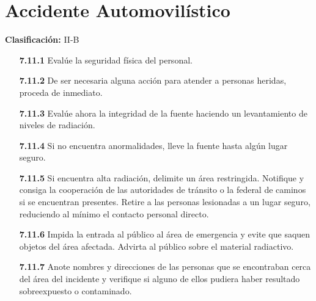 \section*{Accidente Automovilístico}

\textbf{Clasificación:} II-B

\begin{enumerate}
    \item[\textbf{7.11.1}] Evalúe la seguridad física del personal.
    \item[\textbf{7.11.2}] De ser necesaria alguna acción para atender a personas heridas, proceda de inmediato.
    \item[\textbf{7.11.3}] Evalúe ahora la integridad de la fuente haciendo un levantamiento de niveles de radiación.
    \item[\textbf{7.11.4}] Si no encuentra anormalidades, lleve la fuente hasta algún lugar seguro.
    \item[\textbf{7.11.5}] Si encuentra alta radiación, delimite un área restringida. Notifique y consiga la cooperación de las autoridades de tránsito o la federal de caminos si se encuentran presentes. Retire a las personas lesionadas a un lugar seguro, reduciendo al mínimo el contacto personal directo.
    \item[\textbf{7.11.6}] Impida la entrada al público al área de emergencia y evite que saquen objetos del área afectada. Advirta al público sobre el material radiactivo.
    \item[\textbf{7.11.7}] Anote nombres y direcciones de las personas que se encontraban cerca del área del incidente y verifique si alguno de ellos pudiera haber resultado sobreexpuesto o contaminado.
\end{enumerate}